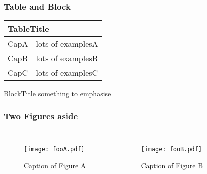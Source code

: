 \begin{frame}
        \frametitle{Table and Block}
        \begin{table}[h]
                \centering
                \begin{tabular}{p{} p{}}
                        \toprule
                        \multicolumn{2}{p{0.9\textwidth}}{TableTitle} \\
                        \midrule
                        CapA       & lots of examplesA \\

                        CapB       & lots of examplesB \\

                        CapC       & lots of examplesC \\
                        \bottomrule
                \end{tabular}
        \end{table}

        \begin{block}{BlockTitle}
                something to emphasise
        \end{block}
\end{frame}



\begin{frame}
        \frametitle{Two Figures aside}
        \begin{columns}[b]
                        \centering
                        \begin{figure}
                                \texttt{[image: fooA.pdf]} \
                                \caption{Caption of Figure A}
                        \end{figure}
                        \centering
                        \begin{figure}
                                \texttt{[image: fooB.pdf]} \
                                \caption{Caption of Figure B}
                        \end{figure}
                \column{0.0125\textwidth}
        \end{columns}
\end{frame}




